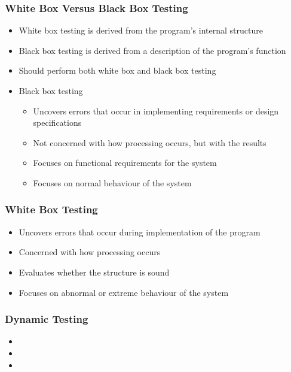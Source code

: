 \documentclass[t,12pt,numbers,fleqn]{beamer}
\begin{document}

\begin{frame}
\frametitle{White Box Versus Black Box Testing}
\begin{itemize}
\item White box testing is derived from the program's internal structure
\item Black box testing is derived from a description of the program's function
\item Should perform both white box and black box testing
\item Black box testing
\begin{itemize}
\item Uncovers errors that occur in implementing requirements or design specifications
\item Not concerned with how processing occurs, but with the results
\item Focuses on functional requirements for the system
\item Focuses on normal behaviour of the system
\end{itemize}
\end{itemize}
\end{frame}


\begin{frame}
\frametitle{White Box Testing}

\begin{itemize}
\item Uncovers errors that occur during implementation of the program
\item Concerned with how processing occurs
\item Evaluates whether the structure is sound
\item Focuses on abnormal or extreme behaviour of the system
\end{itemize}

\end{frame}


\begin{frame}
\frametitle{Dynamic Testing}
\begin{itemize}
\item {}
\item {}
\item {}
\end{itemize}
\end{frame}
\end{document}
